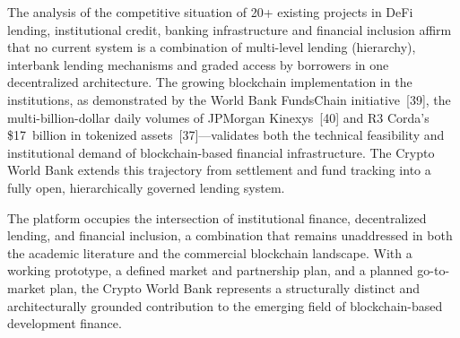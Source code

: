 \documentclass[12pt,a4paper]{report}
\begin{document}
The analysis of the competitive situation of 20+ existing projects in DeFi lending, institutional credit, banking infrastructure and financial inclusion affirm that no current system is a combination of multi-level lending (hierarchy), interbank lending mechanisms and graded access by borrowers in one decentralized architecture. The growing blockchain implementation in the institutions, as demonstrated by the World Bank FundsChain initiative~[39], the multi-billion-dollar daily volumes of JPMorgan Kinexys~[40] and R3 Corda's \$17~billion in tokenized assets~[37]---validates both the technical feasibility and institutional demand of blockchain-based financial infrastructure. The Crypto World Bank extends this trajectory from settlement and fund tracking into a fully open, hierarchically governed lending system.

The platform occupies the intersection of institutional finance, decentralized lending, and financial inclusion, a combination that remains unaddressed in both the academic literature and the commercial blockchain landscape. With a working prototype, a defined market and partnership plan, and a planned go-to-market plan, the Crypto World Bank represents a structurally distinct and architecturally grounded contribution to the emerging field of blockchain-based development finance.
\end{document}
